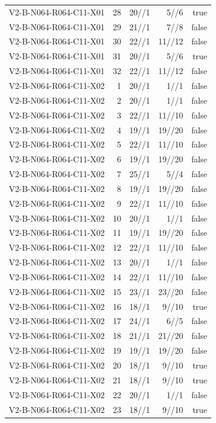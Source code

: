 {\begin{longtable}{lrrrr}
V2-B-N064-R064-C11-X01 & 28 & 20//1 & 5//6 & true \\
V2-B-N064-R064-C11-X01 & 29 & 21//1 & 7//8 & false \\
V2-B-N064-R064-C11-X01 & 30 & 22//1 & 11//12 & false \\
V2-B-N064-R064-C11-X01 & 31 & 20//1 & 5//6 & true \\
V2-B-N064-R064-C11-X01 & 32 & 22//1 & 11//12 & false \\
V2-B-N064-R064-C11-X02 & 1 & 20//1 & 1//1 & false \\
V2-B-N064-R064-C11-X02 & 2 & 20//1 & 1//1 & false \\
V2-B-N064-R064-C11-X02 & 3 & 22//1 & 11//10 & false \\
V2-B-N064-R064-C11-X02 & 4 & 19//1 & 19//20 & false \\
V2-B-N064-R064-C11-X02 & 5 & 22//1 & 11//10 & false \\
V2-B-N064-R064-C11-X02 & 6 & 19//1 & 19//20 & false \\
V2-B-N064-R064-C11-X02 & 7 & 25//1 & 5//4 & false \\
V2-B-N064-R064-C11-X02 & 8 & 19//1 & 19//20 & false \\
V2-B-N064-R064-C11-X02 & 9 & 22//1 & 11//10 & false \\
V2-B-N064-R064-C11-X02 & 10 & 20//1 & 1//1 & false \\
V2-B-N064-R064-C11-X02 & 11 & 19//1 & 19//20 & false \\
V2-B-N064-R064-C11-X02 & 12 & 22//1 & 11//10 & false \\
V2-B-N064-R064-C11-X02 & 13 & 20//1 & 1//1 & false \\
V2-B-N064-R064-C11-X02 & 14 & 22//1 & 11//10 & false \\
V2-B-N064-R064-C11-X02 & 15 & 23//1 & 23//20 & false \\
V2-B-N064-R064-C11-X02 & 16 & 18//1 & 9//10 & true \\
V2-B-N064-R064-C11-X02 & 17 & 24//1 & 6//5 & false \\
V2-B-N064-R064-C11-X02 & 18 & 21//1 & 21//20 & false \\
V2-B-N064-R064-C11-X02 & 19 & 19//1 & 19//20 & false \\
V2-B-N064-R064-C11-X02 & 20 & 18//1 & 9//10 & true \\
V2-B-N064-R064-C11-X02 & 21 & 18//1 & 9//10 & true \\
V2-B-N064-R064-C11-X02 & 22 & 20//1 & 1//1 & false \\
V2-B-N064-R064-C11-X02 & 23 & 18//1 & 9//10 & true \\

\end{longtable}}

